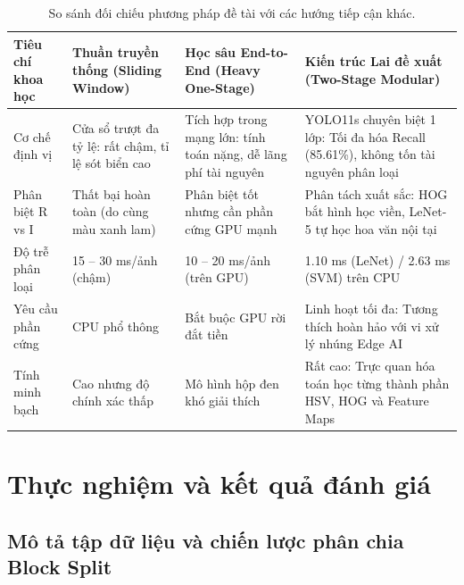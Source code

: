 \documentclass[a4paper, 11pt]{article}
\begin{document}
\begin{table}[H]
\centering
\small
\caption{So sánh đối chiếu phương pháp đề tài với các hướng tiếp cận khác.}
\label{tab:so_sanh_ly_thuyet}
\begin{tabularx}{\textwidth}{|p{2.8cm}|p{3.5cm}|p{3.8cm}|Y|}
\hline
\textbf{Tiêu chí khoa học} & \textbf{Thuần truyền thống (Sliding Window)} & \textbf{Học sâu End-to-End (Heavy One-Stage)} & \textbf{Kiến trúc Lai đề xuất (Two-Stage Modular)} \\
\hline
Cơ chế định vị & Cửa sổ trượt đa tỷ lệ: rất chậm, tỉ lệ sót biển cao & Tích hợp trong mạng lớn: tính toán nặng, dễ lãng phí tài nguyên & YOLO11s chuyên biệt 1 lớp: Tối đa hóa Recall (85.61\%), không tốn tài nguyên phân loại \\
\hline
Phân biệt R vs I & Thất bại hoàn toàn (do cùng màu xanh lam) & Phân biệt tốt nhưng cần phần cứng GPU mạnh & Phân tách xuất sắc: HOG bắt hình học viền, LeNet-5 tự học hoa văn nội tại \\
\hline
Độ trễ phân loại & 15 -- 30 ms/ảnh (chậm) & 10 -- 20 ms/ảnh (trên GPU) & 1.10 ms (LeNet) / 2.63 ms (SVM) trên CPU \\
\hline
Yêu cầu phần cứng & CPU phổ thông & Bắt buộc GPU rời đắt tiền & Linh hoạt tối đa: Tương thích hoàn hảo với vi xử lý nhúng Edge AI \\
\hline
Tính minh bạch & Cao nhưng độ chính xác thấp & Mô hình hộp đen khó giải thích & Rất cao: Trực quan hóa toán học từng thành phần HSV, HOG và Feature Maps \\
\hline
\end{tabularx}
\end{table}

\section{Thực nghiệm và kết quả đánh giá}
\label{sec:thuc_nghiem}

\subsection{Mô tả tập dữ liệu và chiến lược phân chia Block Split}
\label{subsec:dataset_blocksplit}
\end{document}
